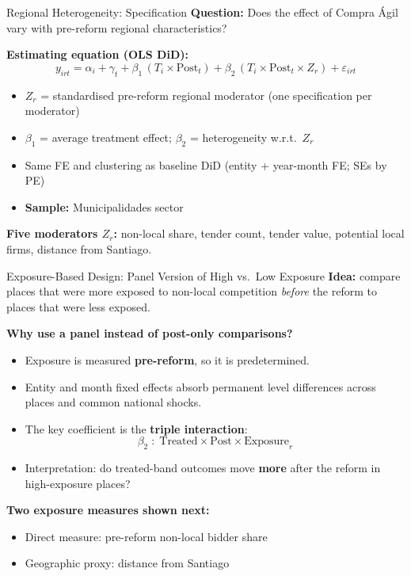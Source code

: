 \documentclass[9pt,aspectratio=169]{beamer}
\begin{document}
\begin{frame}{Regional Heterogeneity: Specification}
\textbf{Question:} Does the effect of Compra Ágil vary with pre-reform
regional characteristics?

\bigskip
\textbf{Estimating equation (OLS DiD):}
\[
  y_{irt} = \alpha_i + \gamma_t
    + \beta_1\,(T_i \times \text{Post}_t)
    + \beta_2\,(T_i \times \text{Post}_t \times Z_r)
    + \varepsilon_{irt}
\]

\medskip
\begin{itemize}
  \item $Z_r$ = standardised pre-reform regional moderator
        (one specification per moderator)
  \item $\beta_1$ = average treatment effect;
        \quad $\beta_2$ = heterogeneity w.r.t.\ $Z_r$
  \item Same FE and clustering as baseline DiD
        (entity + year-month FE; SEs by PE)
  \item \textbf{Sample:} Municipalidades sector
\end{itemize}

\medskip
\textbf{Five moderators $Z_r$:} non-local share, tender count, tender value,
potential local firms, distance from Santiago.
\end{frame}

\begin{frame}{Exposure-Based Design: Panel Version of High vs.\ Low Exposure}
\small
\textbf{Idea:} compare places that were more exposed to non-local competition
\emph{before} the reform to places that were less exposed.

\medskip
\textbf{Why use a panel instead of post-only comparisons?}
\begin{itemize}
  \item Exposure is measured \textbf{pre-reform}, so it is predetermined.
  \item Entity and month fixed effects absorb permanent level differences across places and common national shocks.
  \item The key coefficient is the \textbf{triple interaction}:
\[
  \beta_2 \;:\; \text{Treated} \times \text{Post} \times \text{Exposure}_r
\]
  \item Interpretation: do treated-band outcomes move \textbf{more} after the reform in high-exposure places?
\end{itemize}

\medskip
\textbf{Two exposure measures shown next:}
\begin{itemize}
  \item Direct measure: pre-reform non-local bidder share
  \item Geographic proxy: distance from Santiago
\end{itemize}
\end{frame}
\end{document}
